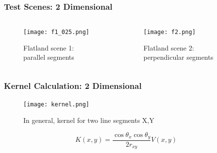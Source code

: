       \begin{frame}\frametitle{Test Scenes: 2 Dimensional}
        \begin{columns}[T]
          \begin{column}{.4\textwidth}
      
                \begin{figure}
              \centering
              \captionsetup{justification=centering}

              \texttt{[image: f1\_025.png]}
              \caption{Flatland scene 1: parallel segments}
              \label{fig_parallel}
              \end{figure}
                  

          \end{column}
        \begin{column}{.5\textwidth}

                   \begin{figure}
                \centering
              \captionsetup{justification=centering}

                \texttt{[image: f2.png]}
                \caption{Flatland scene 2: perpendicular segments}
                \label{fig_parallel}
                \end{figure}
        \end{column}
      \end{columns}
    \end{frame} 





    \begin{frame}\frametitle{Kernel Calculation: 2 Dimensional }

          \begin{figure}
          \centering
          \texttt{[image: kernel.png]}
          \caption{ In general, kernel for two line segments X,Y}
          \label{fig_gen_kernel_2D}
          \end{figure}

          \vspace{-5 mm}

          \begin{equation} \label{eq:2dkernel}
          K(x,y) =  \frac{\cos \theta_x \cos \theta_y} {2 r_{xy}}V(x,y) 
          \end{equation}

    \end{frame}


